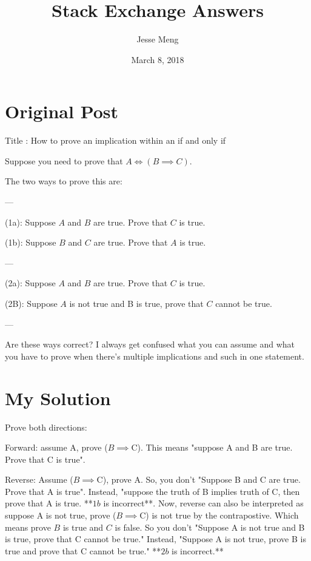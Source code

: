 \documentclass{article}
\title{Stack Exchange Answers}
\author{Jesse Meng }
\date{March 8, 2018}
\begin{document}
\maketitle

\section{Original Post}
Title : How to prove an implication within an if and only if

Suppose you need to prove that $A\iff (B\implies C)$.

The two ways to prove this are:

---

(1a): Suppose $A$ and $B$ are true. Prove that $C$ is true.

(1b): Suppose $B$ and $C$ are true. Prove that $A$ is true.

---

(2a): Suppose $A$ and $B$ are true. Prove that $C$ is true.

(2B): Suppose $A$ is not true and B is true, prove that $C$ cannot be true.

---

Are these ways correct? I always get confused what you can assume and what you have to prove when there's multiple implications and such in one statement.
\section{My Solution}
Prove both directions:

Forward: assume A, prove ($B \implies $C). This means "suppose A and B are true. Prove that C is true".

Reverse: Assume ($B \implies $C), prove A. So, you don't  "Suppose B and C are true. Prove that A is true". Instead, "suppose the truth of B implies truth of C, then prove that A is true. **$1b$ is incorrect**.
Now, reverse can also be interpreted as suppose A is not true, prove ($B \implies $C) is not true by the contrapostive. Which means prove $B$ is true and $C$ is false. So you don't "Suppose A is not true and B is true, prove that C cannot be true." Instead, "Suppose A is not true, prove B is true and prove that C cannot be true." **$2b$ is incorrect.**
\end{document}
